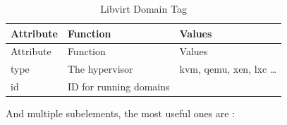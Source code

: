 \documentclass[
  14pt,
  english,
  a4paper,
]{scrreprt}
\begin{document}
\hypertarget{tbl:lvirt_dom_tag}{}
\begin{longtable}[]{@{}lll@{}}
\caption{\label{tbl:lvirt_dom_tag}Libvirt Domain Tag}\tabularnewline
\toprule
\begin{minipage}[b]{0.15\columnwidth}\raggedright
Attribute\strut
\end{minipage} & \begin{minipage}[b]{0.32\columnwidth}\raggedright
Function\strut
\end{minipage} & \begin{minipage}[b]{0.33\columnwidth}\raggedright
Values\strut
\end{minipage}\tabularnewline
\midrule
\endfirsthead
\toprule
\begin{minipage}[b]{0.15\columnwidth}\raggedright
Attribute\strut
\end{minipage} & \begin{minipage}[b]{0.32\columnwidth}\raggedright
Function\strut
\end{minipage} & \begin{minipage}[b]{0.33\columnwidth}\raggedright
Values\strut
\end{minipage}\tabularnewline
\midrule
\endhead
\begin{minipage}[t]{0.15\columnwidth}\raggedright
type\strut
\end{minipage} & \begin{minipage}[t]{0.32\columnwidth}\raggedright
The hypervisor\strut
\end{minipage} & \begin{minipage}[t]{0.33\columnwidth}\raggedright
kvm, qemu, xen, lxc \ldots{}\strut
\end{minipage}\tabularnewline
\begin{minipage}[t]{0.15\columnwidth}\raggedright
id\strut
\end{minipage} & \begin{minipage}[t]{0.32\columnwidth}\raggedright
ID for running domains\strut
\end{minipage} & \begin{minipage}[t]{0.33\columnwidth}\raggedright
\strut
\end{minipage}\tabularnewline
\bottomrule
\end{longtable}

And multiple subelements, the most useful ones are :
\end{document}
